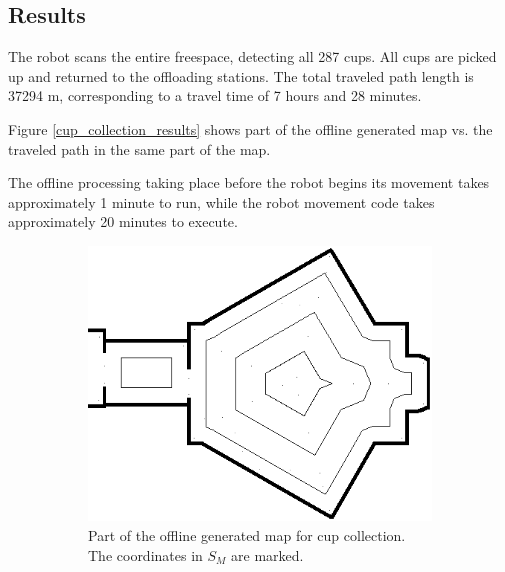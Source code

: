 \subsection{Results}
The robot scans the entire freespace, detecting all 287 cups.
All cups are picked up and returned to the offloading stations.
The total traveled path length is 37294 m, corresponding to a travel time of 7 hours and 28 minutes.

Figure \ref{cup_collection_results} shows part of the offline generated map vs. the traveled path in the same part of the map.

The offline processing taking place before the robot begins its movement takes approximately 1 minute
to run, while the robot movement code takes approximately 20 minutes to execute.

\begin{figure}[ht]
\centering
  \begin{subfigure}[t]{0.3\textwidth}
    \includegraphics[width = \textwidth]{graphics/cup_collect_plan}
    \caption{Part of the offline generated map for cup collection. The coordinates in \(S_{M}\) are marked.}
    \label{cup_collect_plan}
  \end{subfigure}
  \begin{subfigure}[t]{0.3\textwidth}

\end{subfigure}
\end{figure}
